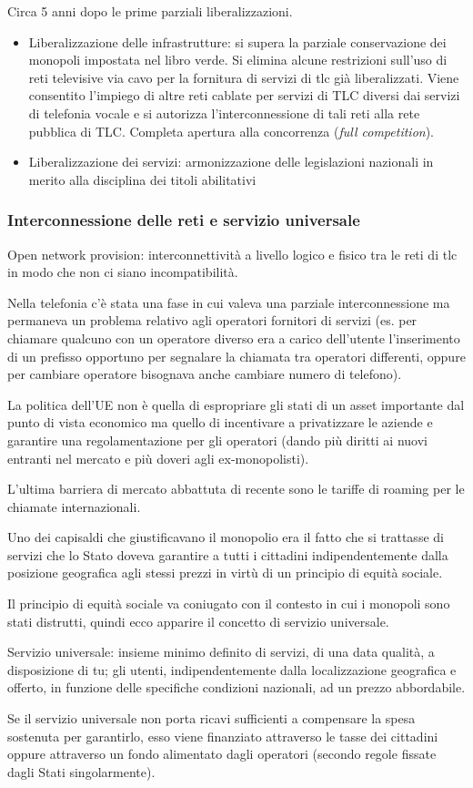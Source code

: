 Circa 5 anni dopo le prime parziali liberalizzazioni. \
\begin{itemize}
    \item Liberalizzazione delle infrastrutture: si supera la parziale conservazione dei monopoli impostata nel libro verde. Si elimina alcune restrizioni sull'uso di reti televisive via cavo per la fornitura di servizi di tlc già liberalizzati. Viene consentito l'impiego di altre reti cablate per servizi di TLC diversi dai servizi di telefonia vocale e si autorizza l'interconnessione di tali reti alla rete pubblica di TLC. Completa apertura alla concorrenza (\textit{full competition}).
    \item Liberalizzazione dei servizi: armonizzazione delle legislazioni nazionali in merito alla disciplina dei titoli abilitativi
\end{itemize}

\subsubsection{Interconnessione delle reti e servizio universale}

Open network provision: interconnettività a livello logico e fisico tra le reti di tlc in modo che non ci siano incompatibilità.

Nella telefonia c'è stata una fase in cui valeva una parziale interconnessione ma permaneva un problema relativo agli operatori fornitori di servizi (es. per chiamare qualcuno con un operatore diverso era a carico dell'utente l'inserimento di un prefisso opportuno per segnalare la chiamata tra operatori differenti, oppure per cambiare operatore bisognava anche cambiare numero di telefono). 

La politica dell'UE non è quella di espropriare gli stati di un asset importante dal punto di vista economico ma quello di incentivare a privatizzare le aziende e garantire una regolamentazione per gli operatori (dando più diritti ai nuovi entranti nel mercato e più doveri agli ex-monopolisti). 

L'ultima barriera di mercato abbattuta di recente sono le tariffe di roaming per le chiamate internazionali.


Uno dei capisaldi che giustificavano il monopolio era il fatto che si trattasse di servizi che lo Stato doveva garantire a tutti i cittadini indipendentemente dalla posizione geografica agli stessi prezzi in virtù di un principio di equità sociale.

Il principio di equità sociale va coniugato con il contesto in cui i monopoli sono stati distrutti, quindi ecco apparire il concetto di servizio universale.

Servizio universale: insieme minimo definito di servizi, di una data qualità, a disposizione di tu; gli utenti, indipendentemente dalla localizzazione geografica e offerto, in funzione delle specifiche condizioni nazionali, ad un prezzo abbordabile.

Se il servizio universale non porta ricavi sufficienti a compensare la spesa sostenuta per garantirlo, esso viene finanziato attraverso le tasse dei cittadini oppure attraverso un fondo alimentato dagli operatori (secondo regole fissate dagli Stati singolarmente).